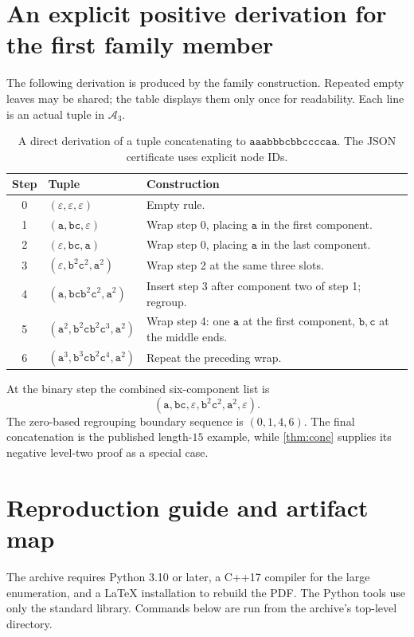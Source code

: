 \documentclass[11pt,letterpaper]{article}
\numberwithin{equation}{section}
\theoremstyle{definition}
\theoremstyle{remark}
\newcommand{\A}{\mathcal A}
\newcommand{\eps}{\varepsilon}
\renewcommand{\aa}{\mathtt a}
\newcommand{\bb}{\mathtt b}
\newcommand{\cc}{\mathtt c}
\newcommand{\word}[1]{\texttt{#1}}
\begin{document}
\section{An explicit positive derivation for the first family member}
\label{app:example}
The following derivation is produced by the family construction.
Repeated empty leaves may be shared; the table displays them only
once for readability. Each line is an actual tuple in \(\A_3\).
\begin{table}[htbp]
\centering
\small
\begin{tabularx}{\linewidth}{c l X}
\toprule
Step & Tuple & Construction\\
\midrule
0 & \((\eps,\eps,\eps)\) & Empty rule.\\
1 & \((\aa,\bb\cc,\eps)\) & Wrap step 0, placing \(\aa\) in the first component.\\
2 & \((\eps,\bb\cc,\aa)\) & Wrap step 0, placing \(\aa\) in the last component.\\
3 & \((\eps,\bb^2\cc^2,\aa^2)\) & Wrap step 2 at the same three slots.\\
4 & \((\aa,\bb\cc\bb^2\cc^2,\aa^2)\) & Insert step 3 after component two of step 1; regroup.\\
5 & \((\aa^2,\bb^2\cc\bb^2\cc^3,\aa^2)\) & Wrap step 4: one \(\aa\) at the first component, \(\bb,\cc\) at the middle ends.\\
6 & \((\aa^3,\bb^3\cc\bb^2\cc^4,\aa^2)\) & Repeat the preceding wrap.\\
\bottomrule
\end{tabularx}
\caption{A direct derivation of a tuple concatenating to
\(\word{aaabbbcbbccccaa}\). The JSON certificate uses explicit node IDs.}
\end{table}
At the binary step the combined six-component list is
\[
 (\aa,\bb\cc,\eps,\bb^2\cc^2,\aa^2,\eps).
\]
The zero-based regrouping boundary sequence is \((0,1,4,6)\).
The final concatenation is the published length-\(15\) example, while
\cref{thm:cone} supplies its negative level-two proof as a special case.

\section{Reproduction guide and artifact map}
\label{app:reproduce}
The archive requires Python 3.10 or later, a C++17 compiler for the
large enumeration, and a LaTeX installation to rebuild the PDF. The
Python tools use only the standard library. Commands below are run
from the archive's top-level directory.
\end{document}
